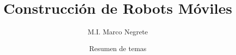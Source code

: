 \documentclass[a4paper]{article}
\title{Construcción de Robots Móviles}
\author{M.I. Marco Negrete}
\date{Resumen de temas}
\begin{document}
\renewcommand{\tablename}{Tabla}
\maketitle

\tableofcontents
\end{document}
